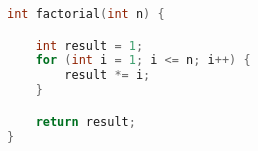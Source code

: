 \begin{lstlisting}[language=C,label={lst:c-factorielle},title={Factorielle en C}]
int factorial(int n) {

    int result = 1;
    for (int i = 1; i <= n; i++) {
        result *= i;
    }

    return result;
}
\end{lstlisting}